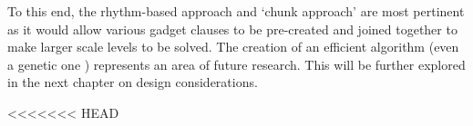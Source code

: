 \documentclass[11pt, a4paper, oneside]{report} %
\begin{document}
To this end, the rhythm-based approach
\cite{compton2006procedural,Smith:2009:RLG:1536513.1536548} and `chunk approach'
\cite{mawhorter2010procedural} are most pertinent as it would allow various
gadget clauses to be pre-created and joined together to make larger scale levels
to be solved. The creation of an efficient algorithm (even a genetic one
\cite{mourato2011automatic}) represents an area of future research. This will be
further explored in the next chapter on design considerations.



<<<<<<< HEAD






\end{document}
